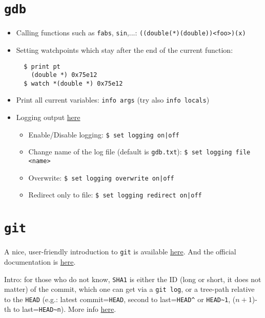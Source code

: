 \documentclass[a4paper,12pt,%
              final%
              ]{article}
\begin{document}
\section{\texttt{gdb}}
\label{sec:gdb}
\begin{itemize}
  \item Calling functions such as \texttt{fabs}, \texttt{sin},...: \texttt{((double(*)(double))<foo>)(x)}
  \item Setting watchpoints which stay after the end of the current function:
\begin{verbatim}
  $ print pt
    (double *) 0x75e12
  $ watch *(double *) 0x75e12
\end{verbatim}
  \item Print all current variables: \texttt{info args} (try also \texttt{info locals})
  \item Logging output \href{https://sourceware.org/gdb/onlinedocs/gdb/Logging-Output.html}{here}
    \begin{itemize}
      \item Enable/Disable logging: \verb!$ set logging on|off!
      \item Change name of the log file (default is \texttt{gdb.txt}): \verb|$ set logging file <name>|
      \item Overwrite: \verb!$ set logging overwrite on|off!
      \item Redirect only to file: \verb!$ set logging redirect on|off!
    \end{itemize}
\end{itemize}

\section{\texttt{git}}
\label{sec:git}
A nice, user-friendly introduction to \texttt{git} is available \href{https://www.atlassian.com/git/tutorials/learn-git-with-bitbucket-cloud}{here}. And the official documentation is \href{https://git-scm.com/doc}{here}.

Intro: for those who do not know, \texttt{SHA1} is either the ID (long or short, it does not matter) of the commit, which one can get via a \texttt{git log}, or a tree-path relative to the \texttt{HEAD} (e.g.: latest commit=\texttt{HEAD}, second to last=\verb|HEAD^| or \verb|HEAD~1|, ($n+1$)-th to last=\verb|HEAD~n|). More info \href{https://git-scm.com/docs/git-cherry-pick}{here}.
\end{document}
